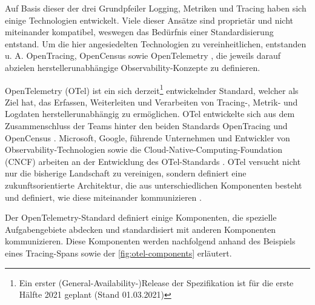 
Auf Basis dieser der drei Grundpfeiler Logging, Metriken und Tracing haben sich einige Technologien entwickelt. Viele dieser Ansätze sind proprietär und nicht miteinander kompatibel, weswegen das Bedürfnis einer Standardisierung entstand. Um die hier angesiedelten Technologien zu vereinheitlichen, entstanden u. A. OpenTracing, OpenCensus \cite{OpenCensus} sowie OpenTelemetry \cite{OpenTelemetry}, die jeweils darauf abzielen herstellerunabhängige Observability-Konzepte zu definieren.

OpenTelemetry (OTel) ist ein sich derzeit\footnote{Ein erster (General-Availability-)Release der Spezifikation ist für die erste Hälfte 2021 geplant \cite{OpenTelemetryGARelease} (Stand 01.03.2021)} entwickelnder Standard, welcher als Ziel hat, das Erfassen, Weiterleiten und Verarbeiten von Tracing-, Metrik- und Logdaten\footnotemark{} herstellerunabhängig zu ermöglichen. OTel entwickelte sich aus dem Zusammenschluss der Teams hinter den beiden Standards OpenTracing und OpenCensus  \cite{UseNixDistributiveTracing}. Microsoft, Google, führende Unternehmen und Entwickler von Observability-Technologien sowie die Cloud-Native-Computing-Foundation (CNCF) arbeiten an der Entwicklung des OTel-Standards \cite{DistributedTracingInPractice} \cite{OpenTelemetryCommunityMembers}. OTel versucht nicht nur die bisherige Landschaft zu vereinigen, sondern definiert eine zukunftsorientierte Architektur, die aus unterschiedlichen Komponenten besteht und definiert, wie diese miteinander kommunizieren \cite{DistributedTracingInPractice}.


Der OpenTelemetry-Standard definiert einige Komponenten, die spezielle Aufgabengebiete abdecken und standardisiert mit anderen Komponenten kommunizieren. Diese Komponenten werden nachfolgend anhand des Beispiels eines Tracing-Spans sowie der \autoref{fig:otel-components} erläutert.

